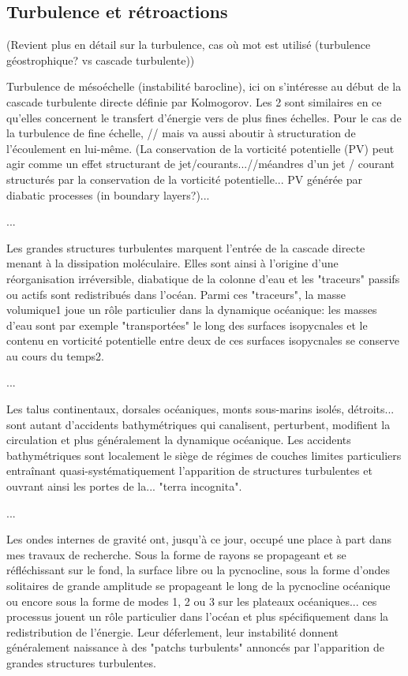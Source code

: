 \subsection{Turbulence et rétroactions}
(Revient plus en détail sur la turbulence, cas où mot est utilisé (turbulence géostrophique? vs cascade turbulente))

Turbulence de mésoéchelle (instabilité barocline), ici on s'intéresse au début de la cascade turbulente directe définie par Kolmogorov. Les 2 sont similaires en ce qu'elles concernent le transfert d'énergie vers de plus fines échelles. Pour le cas de la turbulence de fine échelle, // mais va aussi aboutir à structuration de l'écoulement en lui-même. (La conservation de la vorticité potentielle (PV) peut agir comme un effet structurant de jet/courants...//méandres d'un jet / courant structurés par la conservation de la vorticité potentielle... PV générée par diabatic processes (in boundary layers?)...

...

Les grandes structures turbulentes marquent l'entrée de la cascade directe menant à la dissipation moléculaire. Elles sont ainsi à l'origine d'une réorganisation irréversible, diabatique de la colonne d'eau et les "traceurs" passifs ou actifs sont redistribués dans l'océan. Parmi ces "traceurs", la masse volumique1 joue un rôle particulier dans la dynamique océanique: les masses d'eau sont par exemple "transportées" le long des surfaces isopycnales et le contenu en vorticité potentielle entre deux de ces surfaces isopycnales se conserve au cours du temps2.

...

Les talus continentaux, dorsales océaniques, monts sous-marins isolés, détroits... sont autant d'accidents bathymétriques qui canalisent, perturbent, modifient la circulation et plus généralement la dynamique océanique. Les accidents bathymétriques sont localement le siège de régimes de couches limites particuliers entraînant quasi-systématiquement l'apparition de structures turbulentes et ouvrant ainsi les portes de la... "terra incognita".

...

Les ondes internes de gravité ont, jusqu'à ce jour, occupé une place à part dans mes travaux de recherche. Sous la forme de rayons se propageant et se réfléchissant sur le fond, la surface libre ou la pycnocline, sous la forme d'ondes solitaires de grande amplitude se propageant le long de la pycnocline océanique ou encore sous la forme de modes 1, 2 ou 3 sur les plateaux océaniques... ces processus jouent un rôle particulier dans l'océan et plus spécifiquement dans la redistribution de l'énergie. Leur déferlement, leur instabilité donnent généralement naissance à des "patchs turbulents" annoncés par l'apparition de grandes structures turbulentes.

